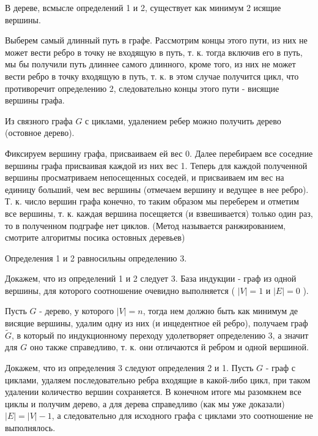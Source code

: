 \begin{Lem}
	В дереве, всмысле определений 1 и 2, существует как минимум 2 исящие вершины.
\end{Lem}

\begin{Proof}
	Выберем самый длинный путь в графе. Рассмотрим концы этого пути, из них не может вести ребро в точку не входящую в путь, т. к. тогда включив его в путь, мы бы получили путь длиннее самого длинного, кроме того, из них не может вести ребро в точку входящую в путь, т. к. в этом случае получится цикл, что противоречит определению 2, следовательно концы этого пути - висящие вершины графа.
\end{Proof}

\begin{Th}
	Из связного графа $G$ с циклами, удалением ребер можно получить дерево (остовное дерево).
\end{Th}

\begin{Proof}
	Фиксируем вершину графа, присваиваем ей вес 0. Далее перебираем все соседние вершины графа присваивая каждой из них вес 1. Теперь для каждой полученной вершины просматриваем непосещенных соседей, и присваиваем им вес на единицу больший, чем вес вершины (отмечаем вершину и ведущее в нее ребро). Т. к. число вершин графа конечно, то таким образом мы переберем и отметим все вершины, т. к. каждая вершина посещяется (и взвешивается) только один раз, то в полученном подграфе нет циклов. (Метод называется ранжированием, смотрите алгоритмы посика остовных деревьев)
\end{Proof}

\begin{Th}
	Определения 1 и 2 равносильны определению 3.
\end{Th}

\begin{Proof}
	Докажем, что из определений 1 и 2 следует 3. База индукции - граф из одной вершины, для которого соотношение очевидно выполняется ( $ \left| V \right| = 1 $ и $ \left| E \right| = 0 $ ).

	Пусть $ G $ - дерево, у которого $ \left| V \right| = n $, тогда  нем должно быть как минимум де висяцие вершины, удалим одну из них (и инцедентное ей ребро), получаем граф $ \tilde G $, в который по индукционному переходу удолетворяет определению 3, а значит для $ G $ оно также справедливо, т. к. они отличаются й ребром и одной вершиной.

	Докажем, что из определения 3 следуют определения 2 и 1. Пусть $ G $ - граф с циклами, удаляем последовательно ребра входящие в какой-либо цикл, при таком удалении количество вершин сохраняется. В конечном итоге мы разомкнем все циклы и получим дерево, а для дерева справедливо (как мы уже доказали) $ \left| E \right| = \left| V \right| - 1 $, а следовательно для исходного графа с циклами это соотношение не выполнялось.
\end{Proof}

